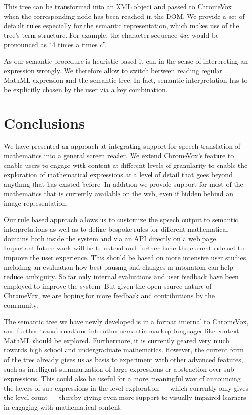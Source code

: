 \documentclass{sig-alternate}
\begin{document}
This tree can be transformed into an XML object and passed to ChromeVox when the
corresponding node has been reached in the DOM. We provide a set of default rules
especially for the semantic representation, which makes use of the tree's term
structure. For example, the character sequence $4ac$ would be
pronounced as ``4 times a times c''.

As our semantic procedure is heuristic based it can in the sense of interpreting
an expression wrongly. We therefore allow to switch between reading regular
MathML expression and the semantic tree. In fact, semantic interpretation has to
be explicitly chosen by the user via a key combination.

\section{Conclusions}
\label{sec:conc}

We have presented an approach at integrating support for speech translation of
mathematics into a general screen reader. We extend ChromeVox's feature to
enable users to engage with content at different levels of granularity to enable
the exploration of mathematical expressions at a level of detail that goes
beyond anything that has existed before. In addition we provide support for most
of the mathematics that is currently available on the web, even if hidden behind
an image representation.

Our rule based approach allows us to customize the speech output to semantic
interpretations as well as to define bespoke rules for different mathematical
domains both inside the system and via an API directly on a web page.  Important
future work will be to extend and further hone the current rule set to improve
the user experience. This should be based on more intensive user studies,
including an evaluation how best pausing and changes in intonation can help
reduce ambiguity. So far only internal evaluations and user feedback have been
employed to improve the system. But given the open source nature of ChromeVox,
we are hoping for more feedback and contributions by the community.

The semantic tree we have newly developed is in a format internal to ChromeVox,
and further transformations into other semantic markup languages like content
MathML should be explored. Furthermore, it is currently geared very much towards
high school and undergraduate mathematics.  However, the current form of the
tree already gives us as basis to experiment with other advanced features, such
as intelligent summarization of large expressions or abstraction over
sub-expressions. This could also be useful for a more meaningful way of
announcing the layers of sub-expressions in the level exploration --- which
currently only gives the level count --- thereby giving even more support to
visually impaired learners in engaging with mathematical content.
\end{document}
